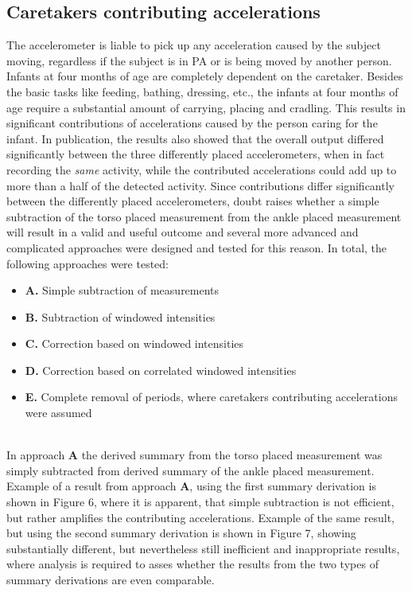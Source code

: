 \documentclass{article}
\begin{document}
{\subsection{Caretakers contributing accelerations}
The accelerometer is liable to pick up any acceleration caused by the subject moving, regardless if the subject is in PA or is being moved by another person. Infants at four months of age are completely dependent on the caretaker. Besides the basic tasks like feeding, bathing, dressing, etc., the infants at four months of age require a substantial amount of carrying, placing and cradling. This results in significant contributions of accelerations caused by the person caring for the infant\cite{ref1}\cite{ref5}\cite{ref6}. In publication\cite{ref5}, the results also showed that the overall output differed significantly between the three differently placed accelerometers, when in fact recording the \textit{same} activity, while the contributed accelerations could add up to more than a half of the detected activity. Since contributions differ significantly between the differently placed accelerometers, doubt raises whether a simple subtraction of the torso placed measurement from the ankle placed measurement will result in a valid and useful outcome and several more advanced and complicated approaches were designed and tested for this reason. In total, the following approaches were tested:
\begin{itemize}
\item \textbf{A.} Simple subtraction of measurements
\item \textbf{B.} Subtraction of windowed intensities
\item \textbf{C.} Correction based on windowed intensities
\item \textbf{D.} Correction based on correlated windowed intensities
\item \textbf{E.} Complete removal of periods, where caretakers contributing accelerations were assumed
\end{itemize}
\\In approach \textbf{A} the derived summary from the torso placed measurement was simply subtracted from derived summary of the ankle placed measurement. Example of a result from approach \textbf{A}, using the first summary derivation is shown in Figure 6, where it is apparent, that simple subtraction is not efficient, but rather amplifies the contributing accelerations.
Example of the same result, but using the second summary derivation is shown in  Figure 7, showing substantially different, but nevertheless still inefficient and inappropriate results, where analysis is required to asses whether the results from the two types of summary derivations are even comparable.
}
\end{document}
